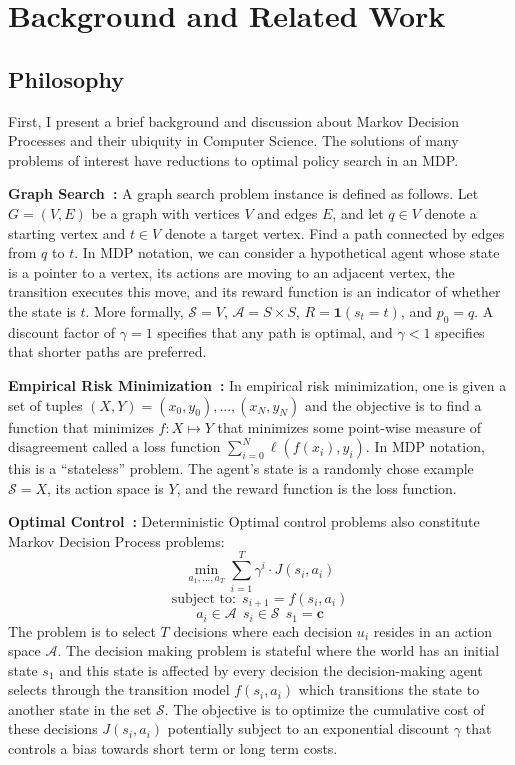 \vspace{0.5em}

\section{Background and Related Work}

\subsection{Philosophy}
First, I present a brief background and discussion about Markov Decision Processes and their ubiquity in Computer Science. The solutions of many problems of interest have reductions to optimal policy search in an MDP.

\vspace{0.5em}\noindent \textbf{Graph Search~\cite{russell2016artificial}: } A graph search problem instance is defined as follows. Let $G=(V,E)$ be a graph with vertices $V$ and edges $E$, and let $q \in V$ denote a starting vertex and $t \in V$ denote a target vertex. Find a path connected by edges from $q$ to $t$. In MDP notation, we can consider a hypothetical agent whose state is a pointer to a vertex, its actions are moving to an adjacent vertex, the transition executes this move, and its reward function is an indicator of whether the state is $t$. More formally, $\mathcal{S} = V$, $\mathcal{A} = S \times S$, $R = \mathbf{1}(s_t = t)$, and $p_0 = q$. A discount factor of $\gamma = 1$ specifies that any path is optimal, and $\gamma < 1$ specifies that shorter paths are preferred.

\vspace{0.5em}\noindent \textbf{Empirical Risk Minimization~\cite{shalev2014understanding}: } In empirical risk minimization, one is given a set of tuples $(X,Y) = {(x_0,y_0),...,(x_N,y_N)}$ and the objective is to find a function that minimizes $f: X \mapsto Y$ that minimizes some point-wise measure of disagreement called a loss function $\sum_{i=0}^N \ell(f(x_i),y_i)$. In MDP notation, this is a ``stateless'' problem.  The agent's state is a randomly chose example $\mathcal{S} = X$, its action space is $Y$, and the reward function is the loss function.

\vspace{0.5em}\noindent \textbf{Optimal Control~\cite{bertsekas1995dynamic}: } Deterministic Optimal control problems also constitute Markov Decision Process problems:
\[
\min_{a_1,...,a_T} \sum_{i=1}^T \gamma^i \cdot J(s_i, a_i) 
\]
\[
\text{subject to:} ~~ s_{i+1} = f(s_i, a_i)
\]
\[
a_i \in \mathcal{A} ~~ s_i \in \mathcal{S} ~~ s_1 = \mathbf{c}
\]
The problem is to select $T$ decisions where each decision $u_i$ resides in an action space $\mathcal{A}$. The decision making problem is stateful where the world has an initial state $s_1$ and this state is affected by every decision the decision-making agent selects through the transition model $f(s_i, a_i)$ which transitions the state to another state in the set $\mathcal{S}$. The objective is to optimize the cumulative cost of these decisions $J(s_i,a_i)$ potentially subject to an exponential discount $\gamma$ that controls a bias towards short term or long term costs.

